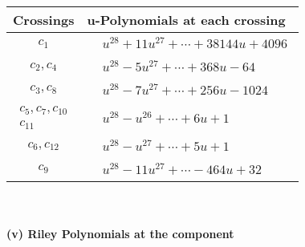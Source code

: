 \documentclass[1p]{elsarticle_modified}
\theoremstyle{definition}
\begin{document}
\begin{tabular}{m{50pt}|m{274pt}}
Crossings & \hspace{64pt}u-Polynomials at each crossing \\
\hline $$\begin{aligned}c_{1}\end{aligned}$$&$\begin{aligned}
&u^{28}+11 u^{27}+\cdots+38144 u+4096
\end{aligned}$\\
\hline $$\begin{aligned}c_{2},c_{4}\end{aligned}$$&$\begin{aligned}
&u^{28}-5 u^{27}+\cdots+368 u-64
\end{aligned}$\\
\hline $$\begin{aligned}c_{3},c_{8}\end{aligned}$$&$\begin{aligned}
&u^{28}-7 u^{27}+\cdots+256 u-1024
\end{aligned}$\\
\hline $$\begin{aligned}c_{5},c_{7},c_{10}\\c_{11}\end{aligned}$$&$\begin{aligned}
&u^{28}- u^{26}+\cdots+6 u+1
\end{aligned}$\\
\hline $$\begin{aligned}c_{6},c_{12}\end{aligned}$$&$\begin{aligned}
&u^{28}- u^{27}+\cdots+5 u+1
\end{aligned}$\\
\hline $$\begin{aligned}c_{9}\end{aligned}$$&$\begin{aligned}
&u^{28}-11 u^{27}+\cdots-464 u+32
\end{aligned}$\\
\hline
\end{tabular}\\~\\
\newpage\renewcommand{\arraystretch}{1}
\flushleft \textbf{(v) Riley Polynomials at the component}\newline \\
\end{document}
